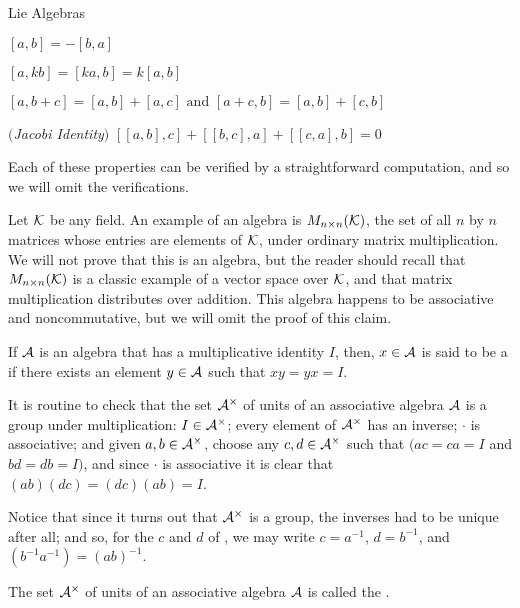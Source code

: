 \begin{section}{Lie Algebras}
\begin{theorem}
  $[a,b] = -[b,a]$

  $[a,kb] = [ka,b] = k[a,b]$

  $[a,b+c] = [a,b] + [a,c] \mbox{ and } [a + c, b] = [a,b] + [c,b]$

  $($\emph{Jacobi Identity}$)$ $[[a,b],c] + [[b,c],a] + [[c,a],b] = 0$
\end{theorem}

Each of these properties can be verified by a straightforward computation, and so we will omit the verifications.

Let $\mathcal{K}$ be any field.  An example of an algebra is $M_{n \times n}(\mathcal{K})$, the set of all $n$ by $n$ matrices whose entries are elements of $\mathcal{K}$, under ordinary matrix multiplication.  We will not prove that this is an algebra, but the reader should recall that $M_{n \times n}(\mathcal{K})$ is a classic example of a vector space over $\mathcal{K}$, and that matrix multiplication distributes over addition.  This algebra happens to be associative and noncommutative, but we will omit the proof of this claim.

\begin{definition}
\label{unit}
If $\mathcal{A}$ is an algebra that has a multiplicative identity $I$, then, $x \in \mathcal{A}$ is said to be a  if there exists an element $y \in \mathcal{A}$ such that $xy = yx = I$.
\end{definition}

It is routine to check that the set $\mathcal{A}^\times$ of units of an associative algebra $\mathcal{A}$ is a group under multiplication:  $I \in \mathcal{A}^\times$;  every element of $\mathcal{A}^\times$ has an inverse;  $\cdot$ is associative; and  given $a,b \in \mathcal{A}^\times$, choose any $c, d \in \mathcal{A}^\times$ such that $(ac = ca = I$ and $bd = db = I)$, and since $\cdot$ is associative it is clear that $(ab)(dc) = (dc)(ab) = I$.

Notice that since it turns out that $\mathcal{A}^\times$ is a group, the inverses had to be unique after all; and so, for the $c$ and $d$ of , we may write $c = a^{-1}$, $d = b^{-1}$, and $(b^{-1}a^{-1}) = (ab)^{-1}$.

\begin{definition}
\label{groupunits}
The set $\mathcal{A}^\times$ of units of an associative algebra $\mathcal{A}$ is called the .
\end{definition}


\end{section}
